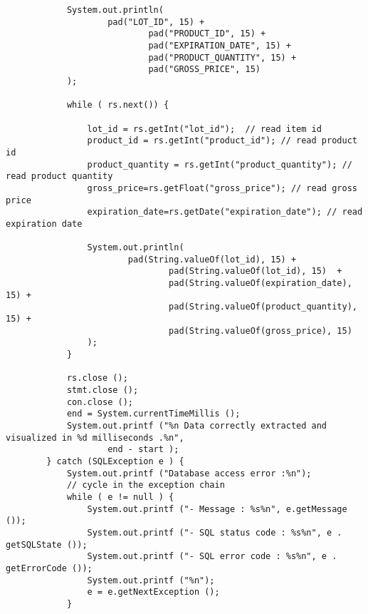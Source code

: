 \begin{lstlisting}
            System.out.println(
                    pad("LOT_ID", 15) +
                            pad("PRODUCT_ID", 15) +
                            pad("EXPIRATION_DATE", 15) +
                            pad("PRODUCT_QUANTITY", 15) +
                            pad("GROSS_PRICE", 15)
            );

            while ( rs.next()) {

                lot_id = rs.getInt("lot_id");  // read item id
                product_id = rs.getInt("product_id"); // read product id
                product_quantity = rs.getInt("product_quantity"); // read product quantity
                gross_price=rs.getFloat("gross_price"); // read gross price
                expiration_date=rs.getDate("expiration_date"); // read expiration date

                System.out.println(
                        pad(String.valueOf(lot_id), 15) +
                                pad(String.valueOf(lot_id), 15)  +
                                pad(String.valueOf(expiration_date), 15) +
                                pad(String.valueOf(product_quantity), 15) +
                                pad(String.valueOf(gross_price), 15)
                );
            }

            rs.close ();
            stmt.close ();
            con.close ();
            end = System.currentTimeMillis ();
            System.out.printf ("%n Data correctly extracted and visualized in %d milliseconds .%n",
                    end - start );
        } catch (SQLException e ) {
            System.out.printf ("Database access error :%n");
            // cycle in the exception chain
            while ( e != null ) {
                System.out.printf ("- Message : %s%n", e.getMessage ());
                System.out.printf ("- SQL status code : %s%n", e . getSQLState ());
                System.out.printf ("- SQL error code : %s%n", e . getErrorCode ());
                System.out.printf ("%n");
                e = e.getNextException ();
            }


\end{lstlisting}

